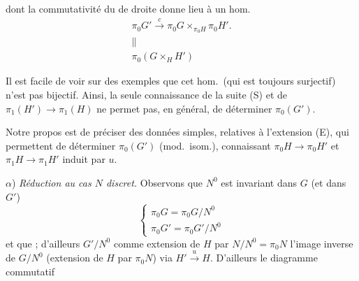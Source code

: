 \documentclass[11pt,a4paper]{article}
\begin{document}
dont la commutativité du  de droite donne lieu à un hom.
\[
  \begin{array}{c}
    \pi_0 G' \xrightarrow{\ c\ } \pi_0 G \times_{\pi_0 H} \pi_0 H' . \\
    \| \\
    \pi_0(G \times_H H')
  \end{array}
\]

Il est facile de voir sur des exemples que cet hom.\ (qui est toujours
surjectif) n'est pas  bijectif. Ainsi, la seule
connaissance de la suite (S) et de $\pi_1(H') \to \pi_1(H)$ ne permet pas, en
général, de \struck{\ill{}} déterminer $\pi_0(G')$.

Notre propos est de préciser des données  simples,
relatives à l'extension (E), qui permettent de \struck{\ill{}}
déterminer
$\pi_0(G')$ (mod.\ isom.), connaissant $\pi_0 H \to \pi_0 H'$ et
$\pi_1 H \to \pi_1 H'$ induit par $u$.


$\alpha$) \emph{Réduction au cas $N$ discret.} Observons que $N^0$ est
invariant dans $G$ (et dans $G'$)
\[
  \left\{ \begin{array}{l}
    \pi_0 G = \pi_0 G / N^0 \\
    \pi_0 G' = \pi_0 G' / N^0
  \end{array} \right.
\]
et que \ill{} ; d'ailleurs $G'/N^0$ comme extension de $H$ par
$N/N^0 = \pi_0 N$  l'image inverse de $G/N^0$ (extension de
$H$ par $\pi_0 N$) via $H' \xrightarrow{u} H$.
D'ailleurs le diagramme commutatif

\end{document}
